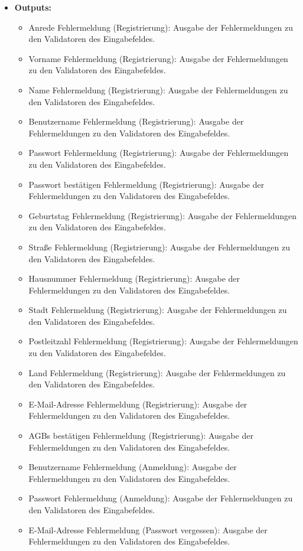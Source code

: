 \begin{itemize}
\begin{itemize}
				
			\end{itemize}
			\item \textbf{Outputs:} 
			\begin{itemize}
				\item Anrede Fehlermeldung (Registrierung): Ausgabe der Fehlermeldungen zu den Validatoren des Eingabefeldes.
				\item Vorname Fehlermeldung (Registrierung): Ausgabe der Fehlermeldungen zu den Validatoren des Eingabefeldes.
				\item Name Fehlermeldung (Registrierung): Ausgabe der Fehlermeldungen zu den Validatoren des Eingabefeldes.
				\item Benutzername Fehlermeldung (Registrierung): Ausgabe der Fehlermeldungen zu den Validatoren des Eingabefeldes.
				\item Passwort Fehlermeldung (Registrierung): Ausgabe der Fehlermeldungen zu den Validatoren des Eingabefeldes.
				\item Passwort bestätigen Fehlermeldung (Registrierung): Ausgabe der Fehlermeldungen zu den Validatoren des Eingabefeldes.
				\item Geburtstag Fehlermeldung (Registrierung): Ausgabe der Fehlermeldungen zu den Validatoren des Eingabefeldes.
				\item Straße Fehlermeldung (Registrierung): Ausgabe der Fehlermeldungen zu den Validatoren des Eingabefeldes.
				\item Hausnummer Fehlermeldung (Registrierung): Ausgabe der Fehlermeldungen zu den Validatoren des Eingabefeldes.
				\item Stadt Fehlermeldung (Registrierung): Ausgabe der Fehlermeldungen zu den Validatoren des Eingabefeldes.
				\item Postleitzahl Fehlermeldung (Registrierung): Ausgabe der Fehlermeldungen zu den Validatoren des Eingabefeldes.
				\item Land Fehlermeldung (Registrierung): Ausgabe der Fehlermeldungen zu den Validatoren des Eingabefeldes.
				\item E-Mail-Adresse Fehlermeldung (Registrierung): Ausgabe der Fehlermeldungen zu den Validatoren des Eingabefeldes.
				\item AGBs bestätigen Fehlermeldung (Registrierung): Ausgabe der Fehlermeldungen zu den Validatoren des Eingabefeldes.
				\item Benutzername Fehlermeldung (Anmeldung): Ausgabe der Fehlermeldungen zu den Validatoren des Eingabefeldes.
				\item Passwort Fehlermeldung (Anmeldung): Ausgabe der Fehlermeldungen zu den Validatoren des Eingabefeldes.
				\item E-Mail-Adresse Fehlermeldung (Passwort vergessen): Ausgabe der Fehlermeldungen zu den Validatoren des Eingabefeldes.
			\end{itemize}
			

\end{itemize}
